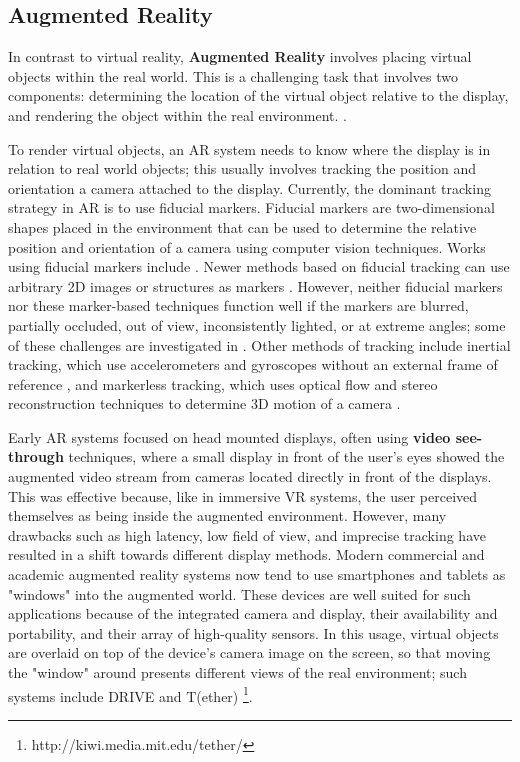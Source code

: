 \documentclass[pageno]{jpaper}
\begin{document}
\subsection{Augmented Reality}
In contrast to virtual reality, {\bf Augmented Reality} involves placing virtual objects within the real world. This is a challenging task that involves two
components: determining the location of the virtual object relative to the display, and rendering the object within the real environment. \cite{zhou2008trends}.

To render virtual objects, an AR system needs to know where the display is in relation to real world objects; this usually involves tracking the position and orientation a camera attached to the
display. Currently, the dominant tracking strategy in AR is to use fiducial markers. Fiducial markers are two-dimensional shapes placed in the environment
that can be used to determine the relative position and orientation of a camera using computer vision techniques. Works using fiducial markers include
\cite{kato1999marker, artoolkit, dedual2011creating}. Newer methods based on fiducial tracking can use arbitrary 2D images or structures as markers \cite{ferrari2001markerless, simon2000markerless}.
However, neither fiducial markers nor these marker-based techniques function
well if the markers are blurred, partially occluded, out of view, inconsistently lighted, or at extreme angles; some of these challenges are investigated in \cite{fiala2010designing}. Other methods of tracking include inertial
tracking, which use accelerometers and gyroscopes without an external frame of reference \cite{lang2002inertial}, and markerless tracking, which uses optical flow and
stereo reconstruction techniques to determine 3D motion of a camera \cite{comport2006real}.

Early AR systems focused on head mounted displays, often using {\bf video see-through} techniques, where a small display in front of the user's eyes showed the augmented video
stream from cameras located directly in front of the displays. This was effective because, like in immersive VR systems, the user perceived themselves as being inside the augmented environment.
However, many drawbacks such as high latency, low field of view, and imprecise tracking \cite{hoffman2008vergence} have resulted in a shift towards different display methods.
Modern commercial and academic augmented reality systems now tend to use smartphones and tablets as "windows" into the augmented world. These devices are well suited for such applications because
of the integrated camera and display, their availability and portability, and their array of high-quality sensors. In this usage, virtual objects are overlaid on top of the
device's camera image on the screen, so that moving the "window" around presents different views of the real environment; such systems
include DRIVE \cite{kim2011drive} and T(ether) \footnote{http://kiwi.media.mit.edu/tether/}.
\end{document}

